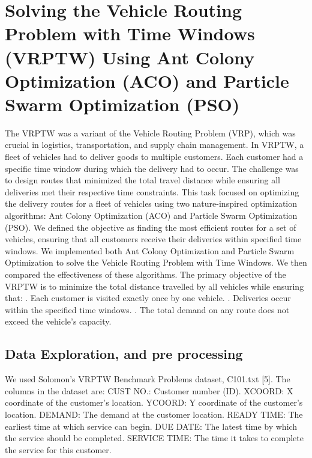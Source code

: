 \section{Solving the Vehicle Routing Problem with Time Windows (VRPTW) Using Ant Colony Optimization (ACO) and Particle Swarm Optimization (PSO)}
The VRPTW was a variant of the Vehicle Routing Problem (VRP), which was crucial in logistics, transportation, and supply chain management. In VRPTW, a fleet of vehicles had to deliver goods to multiple customers. Each customer had a specific time window during which the delivery had to occur. The challenge was to design routes that minimized the total travel distance while ensuring all deliveries met their respective time constraints. This task focused on optimizing the delivery routes for a fleet of vehicles using two nature-inspired optimization algorithms: Ant Colony Optimization (ACO) and Particle Swarm Optimization (PSO). 
\newline
We defined the objective as finding the most efficient routes for a set of vehicles, ensuring that all customers receive their deliveries within specified time windows.
\newline
We implemented both Ant Colony Optimization and Particle Swarm Optimization to solve the Vehicle Routing Problem with Time Windows. We then compared the effectiveness of these algorithms. 
\newline
The primary objective of the VRPTW is to minimize the total distance travelled by all vehicles 
while ensuring that: 
\newline
{}. Each customer is visited exactly once by one vehicle. 
. Deliveries occur within the specified time windows. 
. The total demand on any route does not exceed the vehicle's capacity. 
\subsection{Data Exploration, and pre processing}
We used Solomon’s VRPTW Benchmark Problems dataset, C101.txt [5].
\newline
The columns in the dataset are:
\newline
CUST NO.: Customer number (ID).
\newline
XCOORD: X coordinate of the customer's location.
\newline
YCOORD: Y coordinate of the customer's location.
\newline
DEMAND: The demand at the customer location.
\newline
READY TIME: The earliest time at which service can begin.
\newline
DUE DATE: The latest time by which the service should be completed.
\newline
SERVICE TIME: The time it takes to complete the service for this customer.

